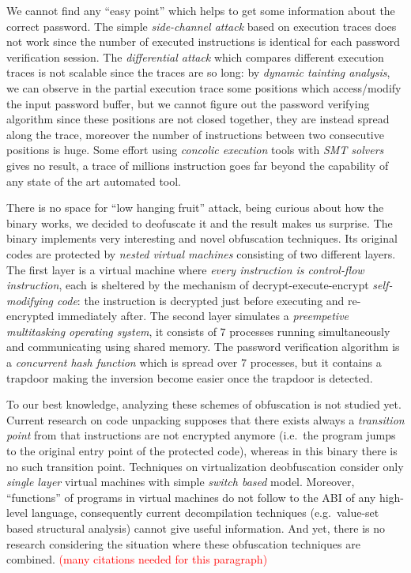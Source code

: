 \documentclass{easychair}
\begin{document}
We cannot find any ``easy point'' which helps to get some information about the correct password. The simple \emph{side-channel attack} based on execution traces does not work since the number of executed instructions is identical for each password verification session. The \emph{differential attack} which compares different execution traces is not scalable since the traces are so long: by \emph{dynamic tainting analysis}, we can observe in the partial execution trace some positions which access/modify the input password buffer, but we cannot figure out the password verifying algorithm since these positions are not closed together, they are instead spread along the trace, moreover the number of instructions between two consecutive positions is huge. Some effort using \emph{concolic execution} tools with \emph{SMT solvers} gives no result, a trace of millions instruction goes far beyond the capability of any state of the art automated tool.

There is no space for ``low hanging fruit'' attack, being curious about how the binary works, we decided to deofuscate it and the result makes us surprise. The binary implements very interesting and novel obfuscation techniques. Its original codes are protected by \emph{nested virtual machines} consisting of two different layers. The first layer is a virtual machine where \emph{every instruction is control-flow instruction}, each is sheltered by the mechanism of decrypt-execute-encrypt \emph{self-modifying code}: the instruction is decrypted just before executing and re-encrypted immediately after. The second layer simulates a \emph{preempetive multitasking operating system}, it consists of $7$ processes running simultaneously and communicating using shared memory. The password verification algorithm is a \emph{concurrent hash function} which is spread over $7$ processes, but it contains a trapdoor making the inversion become easier once the trapdoor is detected.


To our best knowledge, analyzing these schemes of obfuscation is not studied yet. Current research on code unpacking supposes that there exists always a \emph{transition point} from that instructions are not encrypted anymore (i.e.~the program jumps to the original entry point of the protected code), whereas in this binary there is no such transition point. Techniques on virtualization deobfuscation consider only \emph{single layer} virtual machines with simple \emph{switch based} model. Moreover, ``functions'' of programs in virtual machines do not follow to the ABI of any high-level language, consequently current decompilation techniques (e.g.~value-set based structural analysis) cannot give useful information. And yet, there is no research considering the situation where these obfuscation techniques are combined. \textcolor{red}{(many citations needed for this paragraph)}
\end{document}
